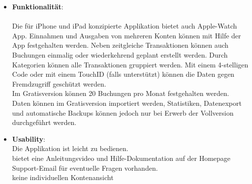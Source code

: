 \documentclass[runningheads,a4paper]{llncs}
\begin{document}
\begin{itemize}
\item \textbf {Funktionalität}: \\\\
Die für iPhone und iPad konzipierte Applikation bietet auch Apple-Watch App. Einnahmen und Ausgaben von mehreren Konten können mit Hilfe der App festgehalten werden. Neben zeitgleiche Transaktionen können auch Buchungen einmalig oder wiederkehrend geplant erstellt werden. Durch Kategorien können alle Transaktionen gruppiert werden.  Mit einem 4-stelligen Code oder mit einem TouchID (falls unterstützt) können die Daten gegen Fremdzugriff geschützt werden. \\

Im Gratisversion können 20 Buchungen pro Monat festgehalten werden.  Daten können im Gratisversion importiert werden, Statistiken, Datenexport und automatische Backups können jedoch nur bei Erwerb der Vollversion durchgeführt werden.\\


\item \textbf {Usability}: \\

\textcolor{green}{}	Die Applikation ist leicht zu bedienen. \\
\textcolor{green}{}	bietet eine Anleitungsvideo und Hilfe-Dokumentation auf der Homepage\\
\textcolor{green}{}	Support-Email für eventuelle Fragen vorhanden.\\
\textcolor{red}{}	keine individuellen Kontenansicht

\end{itemize}


\begin{figure}
\centering
{}
\end{figure}
\clearpage
\end{document}
